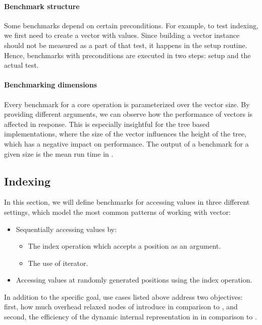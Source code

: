 \paragraph*{Benchmark structure}
Some benchmarks depend on certain preconditions. For example, to test indexing, we first need to create a vector with values. Since building a vector instance should not be measured as a part of that test, it happens in the setup routine. Hence, benchmarks with preconditions are executed in two steps: setup and the actual test. 

\paragraph*{Benchmarking dimensions}
Every benchmark for a core operation is parameterized over the vector size. By providing different arguments, we can observe how the performance of vectors is affected in response. This is especially insightful for the tree based implementations, where the size of the vector influences the height of the tree, which has a negative impact on performance. The output of a benchmark for a given size is the mean run time in . 

\subsection{Indexing}
In this section, we will define benchmarks for accessing values in three different settings, which model the most common patterns of working with vector: 

\begin{itemize}
    \item Sequentially accessing values by:    
    \begin{itemize}
        \item The index operation which accepts a position as an argument. 
        \item The use of iterator. 
    \end{itemize}
    \item Accessing values at randomly generated positions using the index operation. 
\end{itemize}

In addition to the specific goal, use cases listed above address two objectives: first, how much overhead relaxed nodes of \rrbtree{} introduce in comparison to \rbtree{}, and second, the efficiency of the dynamic internal representation in \pvec{} in comparison to \stdvec{}.

